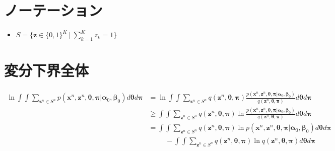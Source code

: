 \documentclass{jsarticle}%
\theoremstyle{definition}
\begin{document}
\tableofcontents
\section*{ノーテーション}
\begin{itemize}
    \item $S=\{\bm{z}\in\{0,1\}^K\ |\ \sum^K_{k=1}z_k=1\}$
\end{itemize}
\section{変分下界全体}
\begin{align}
    \ln \int \int \sum_{\bm{z}^n\in S^n}p(\bm{x}^n, \bm{z}^n, \bm{\theta}, \bm{\pi}|\bm{\alpha}_0,\bm{\beta}_0)d\bm{\theta}d\bm{\pi}
     & =\ln \int \int \sum_{\bm{z}^n\in S^n}q(\bm{z}^n, \bm{\theta}, \bm{\pi})\frac{p(\bm{x}^n, \bm{z}^n, \bm{\theta}, \bm{\pi}|\bm{\alpha}_0,\bm{\beta}_0)}{q(\bm{z}^n, \bm{\theta}, \bm{\pi})}d\bm{\theta}d\bm{\pi}     \\
     & \geq \int \int \sum_{\bm{z}^n\in S^n}q(\bm{z}^n, \bm{\theta}, \bm{\pi})\ln \frac{p(\bm{x}^n, \bm{z}^n, \bm{\theta}, \bm{\pi}|\bm{\alpha}_0,\bm{\beta}_0)}{q(\bm{z}^n, \bm{\theta}, \bm{\pi})}d\bm{\theta}d\bm{\pi} \\
     & = \int \int \sum_{\bm{z}^n\in S^n}q(\bm{z}^n, \bm{\theta}, \bm{\pi})\ln p(\bm{x}^n, \bm{z}^n, \bm{\theta}, \bm{\pi}|\bm{\alpha}_0,\bm{\beta}_0)d\bm{\theta}d\bm{\pi} \label{eqlikelihood}                          \\
     & \hspace{1cm} - \int \int \sum_{\bm{z}^n\in S^n}q(\bm{z}^n, \bm{\theta}, \bm{\pi})\ln q(\bm{z}^n, \bm{\theta}, \bm{\pi})d\bm{\theta}d\bm{\pi} \label{eqentropy}
\end{align}
\newpage
\end{document}
